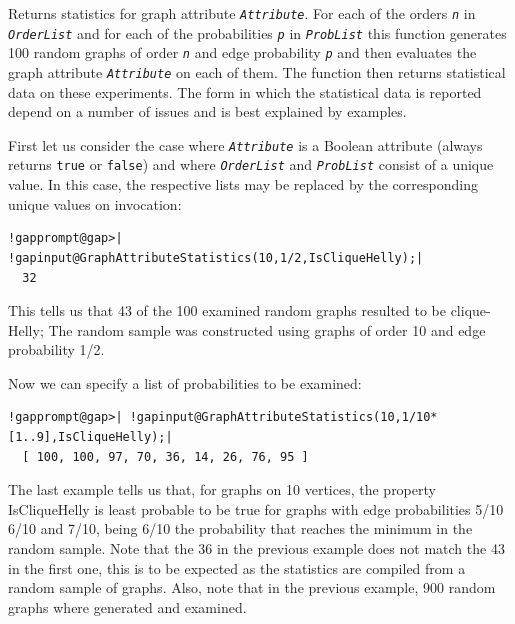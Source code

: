 \documentclass[a4paper,11pt]{report}
\begin{document}
{{{ 

Returns statistics for graph attribute \mbox{\texttt{\mdseries\slshape Attribute}}. For each of the orders \mbox{\texttt{\mdseries\slshape n}} in \mbox{\texttt{\mdseries\slshape OrderList}} and for each of the probabilities \mbox{\texttt{\mdseries\slshape p}} in \mbox{\texttt{\mdseries\slshape ProbList}} this function generates 100 random graphs of order \mbox{\texttt{\mdseries\slshape n}} and edge probability \mbox{\texttt{\mdseries\slshape p}} and then evaluates the graph attribute \mbox{\texttt{\mdseries\slshape Attribute}} on each of them. The function then returns statistical data on these
experiments. The form in which the statistical data is reported depend on a
number of issues and is best explained by examples. 

First let us consider the case where \mbox{\texttt{\mdseries\slshape Attribute}} is a Boolean attribute (always returns \texttt{true} or \texttt{false}) and where \mbox{\texttt{\mdseries\slshape OrderList}} and \mbox{\texttt{\mdseries\slshape ProbList}} consist of a unique value. In this case, the respective lists may be replaced
by the corresponding unique values on invocation: 

 
\begin{Verbatim}[commandchars=!@|,fontsize=\small,frame=single,label=Example]
  !gapprompt@gap>| !gapinput@GraphAttributeStatistics(10,1/2,IsCliqueHelly);|
  32
\end{Verbatim}
 

This tells us that 43 of the 100 examined random graphs resulted to be
clique-Helly; The random sample was constructed using graphs of order 10 and
edge probability 1/2. 

Now we can specify a list of probabilities to be examined: 

 
\begin{Verbatim}[commandchars=!@|,fontsize=\small,frame=single,label=Example]
  !gapprompt@gap>| !gapinput@GraphAttributeStatistics(10,1/10*[1..9],IsCliqueHelly);|
  [ 100, 100, 97, 70, 36, 14, 26, 76, 95 ]
\end{Verbatim}
 

The last example tells us that, for graphs on 10 vertices, the property
IsCliqueHelly is least probable to be true for graphs with edge probabilities
5/10 6/10 and 7/10, being 6/10 the probability that reaches the minimum in the
random sample. Note that the 36 in the previous example does not match the 43
in the first one, this is to be expected as the statistics are compiled from a
random sample of graphs. Also, note that in the previous example, 900 random
graphs where generated and examined. 

}}}
\end{document}

